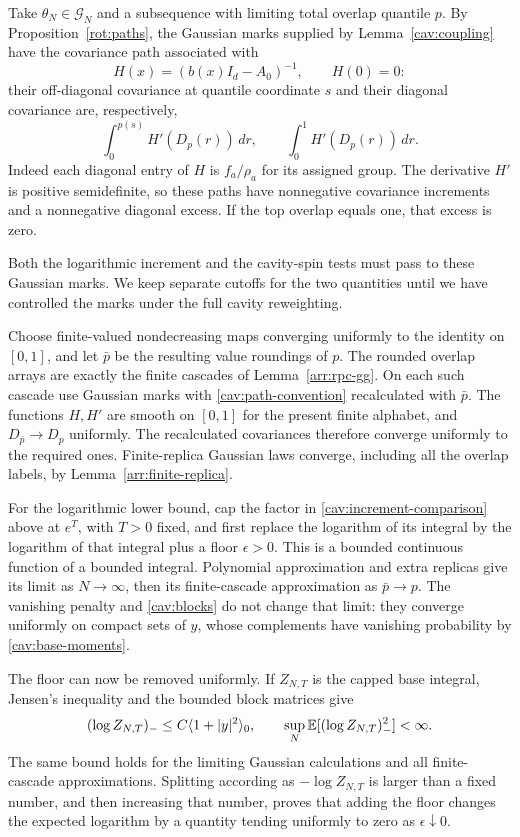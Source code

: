 Take $\theta_N\in\mathcal G_N$ and a subsequence with limiting total
overlap quantile $p$.  By Proposition~\ref{rot:paths}, the Gaussian
marks supplied by Lemma~\ref{cav:coupling} have the covariance path
associated with
\begin{equation}\label{cav:H}
 H(x)=(b(x)I_d-A_0)^{-1},\qquad H(0)=0:
\end{equation}
their off-diagonal covariance at quantile coordinate $s$ and their
diagonal covariance are, respectively,
\begin{equation}\label{cav:path-convention}
 \int_0^{p(s)}H'(D_p(r))\,dr,
 \qquad
 \int_0^1H'(D_p(r))\,dr.
\end{equation}
Indeed each diagonal entry of $H$ is $f_a/\rho_a$ for its assigned
group.  The derivative $H'$ is positive semidefinite, so these paths
have nonnegative covariance increments and a nonnegative diagonal
excess.  If the top overlap equals one, that excess is zero.

Both the logarithmic increment and the cavity-spin tests must pass to
these Gaussian marks.  We keep separate cutoffs for the two quantities
until we have controlled the marks under the full cavity reweighting.

Choose finite-valued nondecreasing maps converging uniformly to the identity
on $[0,1]$, and let $\bar p$ be the resulting value roundings of $p$.
The rounded overlap arrays are exactly the finite cascades of
Lemma~\ref{arr:rpc-gg}.  On each such cascade use Gaussian
marks with \eqref{cav:path-convention} recalculated with $\bar p$.
The functions $H,H'$ are smooth on $[0,1]$ for the present finite
alphabet, and $D_{\bar p}\to D_p$ uniformly.  The recalculated
covariances therefore converge uniformly to the required ones.
Finite-replica Gaussian laws converge, including all the overlap
labels, by Lemma~\ref{arr:finite-replica}.

For the logarithmic lower bound, cap the factor in
\eqref{cav:increment-comparison} above at $e^T$, with $T>0$ fixed,
and first replace the logarithm of its integral by the logarithm of
that integral plus a floor $\epsilon>0$.  This is a bounded continuous
function of a bounded integral.  Polynomial approximation and extra
replicas give its limit as $N\to\infty$, then its finite-cascade
approximation as $\bar p\to p$.  The vanishing penalty and
\eqref{cav:blocks} do not change that limit: they converge uniformly
on compact sets of $y$, whose complements have vanishing probability
by \eqref{cav:base-moments}.

The floor can now be removed uniformly.  If $Z_{N,T}$ is the capped
base integral, Jensen's inequality and the bounded block matrices
give
\begin{equation}\label{cav:negative-log}
 (\log Z_{N,T})_-
 \le C\langle1+|y|^2\rangle_0,
 \qquad
 \sup_N\mathbb E[(\log Z_{N,T})_-^2]<\infty.
\end{equation}
The same bound holds for the limiting Gaussian calculations and all
finite-cascade approximations.  Splitting according as
$-\log Z_{N,T}$ is larger than a fixed number, and then increasing
that number, proves that adding the floor changes the expected
logarithm by a quantity tending uniformly to zero as
$\epsilon\downarrow0$.

